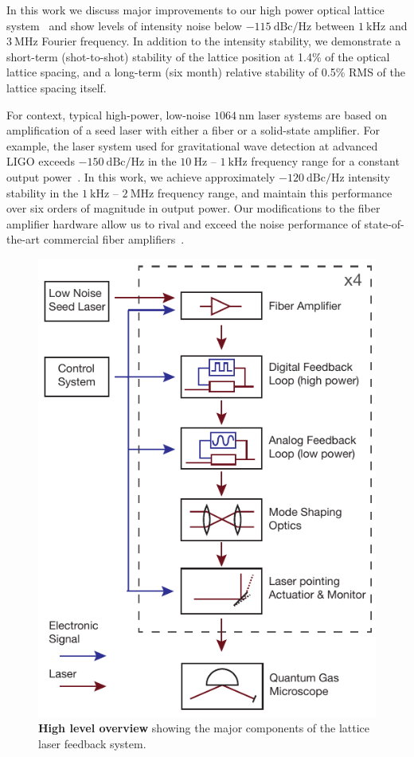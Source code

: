 \documentclass[twocolumn,aip,rsi,reprint,bibnotes]{revtex4-1}
\newcommand\unit[2]{\ensuremath{#1~\mathrm{{#2}}}}
\begin{document}
In this work we discuss major improvements to our high power optical lattice system~\cite{Blatt2015} and show levels of intensity noise below \unit{-115}{dBc/Hz} between \unit{1}{kHz} and \unit{3}{MHz} Fourier frequency.
In addition to the intensity stability, we demonstrate a short-term (shot-to-shot) stability of the lattice position at 1.4\% of the optical lattice spacing, and a long-term (six month) relative stability of 0.5\% RMS of the lattice spacing itself.

For context, typical high-power, low-noise \unit{1064}{nm} laser systems are based on amplification of a seed laser with either a fiber or a solid-state amplifier.
For example, the laser system used for gravitational wave detection at advanced LIGO exceeds \unit{-150}{dBc/Hz} in the \unit{10}{Hz} -- \unit{1}{kHz} frequency range for a constant output power~\cite{kwee12}.
In this work, we achieve approximately \unit{-120}{dBc/Hz} intensity stability in the \unit{1}{kHz} -- \unit{2}{MHz} frequency range, and maintain this performance over six orders of magnitude in output power. Our modifications to the fiber amplifier hardware allow us to rival and exceed the noise performance of state-of-the-art commercial fiber amplifiers~\cite{guiraud16}.

\begin{figure}[t]
  \begin{center}
    \includegraphics[width=0.8\columnwidth]{Figure1.pdf}
    \caption{\textbf{High level overview} showing the major components of the lattice laser feedback system.}\label{fig:high_level}
  \end{center}
\end{figure}
\end{document}
